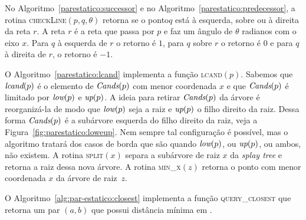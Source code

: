 No Algoritmo~\ref{parestatico:successor} e no Algoritmo~\ref{parestatico:predecessor}, a rotina
\textsc{checkLine}$(p, q, \theta)$ retorna se o ponto$q$ está à esquerda, sobre ou à direita da
reta $r$.
A reta $r$ é a reta que passa por $p$ e faz um ângulo de $\theta$ radianos com o eixo $x$.
Para $q$ à esquerda de $r$ o retorno é $1$, para $q$ sobre $r$ o retorno é $0$ e para $q$ à
direita de $r$, o retorno é $-1$.

O Algoritmo~\ref{parestatico:lcand} implementa a função \textsc{lcand}$(p)$.
Sabemos que $\textit{lcand}(p)$ é o elemento de $\textit{Cands}(p)$ com menor coordenada $x$ e que $\textit{Cands}(p)$ é
limitado por $\textit{low}(p)$ e $\textit{up}(p)$.
A ideia para retirar $\textit{Cands}(p)$ da árvore é reorganizá-la de modo que $\textit{low}(p)$ seja a raiz e
$\textit{up}(p)$ o filho direito da raiz.
Dessa forma $\textit{Cands}(p)$ é a subárvore esquerda do filho direito da raiz, veja a
Figura~\ref{fig:parestatico:loweup}.
Nem sempre tal configuração é possível, mas o algoritmo tratará dos casos de borda que são quando
$\textit{low}(p)$, ou $\textit{up}(p)$, ou ambos, não existem.
A rotina \textsc{split}$(x)$ separa a subárvore de raiz $x$ da \textit{splay tree} e retorna a
raiz dessa nova árvore.
A rotina \textsc{min\_x}$(z)$ retorna o ponto com menor coordenada $x$ da árvore de raiz~$z$.









O Algoritmo~\ref{alg:par-estatico:closest} implementa a função \textsc{query\_closest} que retorna um
par $(a,b)$ que possui distância mínima em \pontos.


